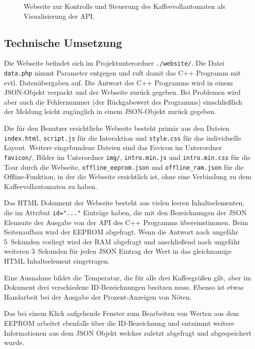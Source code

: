 \begin{figure}
\begin{center}
    \caption{Webseite zur Kontrolle und Steuerung des Kaffeevollautomaten als Visualisierung der API.}
    \label{fig:website}
  \end{center}
\end{figure}

\subsection{Technische Umsetzung}
Die Webseite befindet sich im Projektunterordner \texttt{./website/}.
Die Datei \texttt{data.php} nimmt Parameter entgegen und ruft damit das C++ Programm mit evtl. Datenübergaben auf.
Die Antwort des C++ Programms wird in einem \ac{JSON}-Objekt verpackt und der Webseite zurück gegeben.
Bei Problemen wird aber auch die Fehlernummer (der Rückgabewert des Programms) einschließlich der Meldung leicht zugänglich in einem \ac{JSON}-Objekt zurück gegeben.

Die für den Benutzer ersichtliche Webseite besteht primär aus den Dateien \texttt{index.html}, \texttt{script.js} für die Interaktion und \texttt{style.css} für das individuelle Layout.
Weitere eingebundene Dateien sind das Favicon im Unterordner \texttt{favicon/}, Bilder im Unterordner \texttt{img/}, \texttt{intro.min.js} und \texttt{intro.min.css} für die Tour durch die Webseite, \texttt{offline\_eeprom.json} und \texttt{offline\_ram.json} für die Offline-Funktion, in der die Webseite ersichtlich ist, ohne eine Verbindung zu dem Kaffeevollautomaten zu haben.

Das \ac{HTML} Dokument der Webseite besteht aus vielen leeren Inhaltselementen, die im Attribut \texttt{id="..."} Einträge haben, die mit den Bezeichnungen der \ac{JSON} Elemente der Ausgabe von der API des C++ Programms übereinstimmen.
Beim Seitenaufbau wird der \ac{EEPROM} abgefragt.
Wenn die Antwort nach ungefähr 5~Sekunden vorliegt wird der \ac{RAM} abgefragt und anschließend nach ungefähr weiteren 3~Sekunden für jeden \ac{JSON} Eintrag der Wert in das gleichnamige \ac{HTML} Inhaltselement eingetragen.

Eine Ausnahme bildet die Temperatur, die für alle drei Kaffeegrößen gilt, aber im Dokument drei verschiedene ID-Bezeichnungen besitzen muss.
Ebenso ist etwas Handarbeit bei der Ausgabe der Prozent-Anzeigen von Nöten.

Das bei einem Klick aufgehende Fenster zum Bearbeiten von Werten aus dem \ac{EEPROM} arbeitet ebenfalls über die ID-Bezeichnung und entnimmt weitere Informationen aus dem \ac{JSON} Objekt welches zuletzt abgefragt und abgespeichert wurde.
